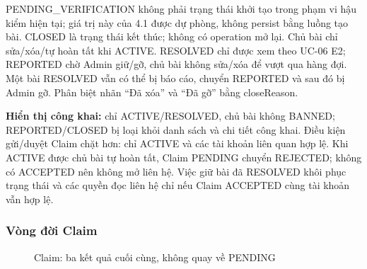 PENDING\_VERIFICATION không phải trạng thái khởi tạo trong phạm vi hậu kiểm hiện tại; giá trị này của 4.1 được dự phòng, không persist bằng luồng tạo bài. CLOSED là trạng thái kết thúc; không có operation mở lại. Chủ bài chỉ sửa/xóa/tự hoàn tất khi ACTIVE. RESOLVED chỉ được xem theo UC-06 E2; REPORTED chờ Admin giữ/gỡ, chủ bài không sửa/xóa để vượt qua hàng đợi. Một bài RESOLVED vẫn có thể bị báo cáo, chuyển REPORTED và sau đó bị Admin gỡ. Phân biệt nhãn ``Đã xóa'' và ``Đã gỡ'' bằng closeReason.

\textbf{Hiển thị công khai:} chỉ ACTIVE/RESOLVED, chủ bài không BANNED; REPORTED/CLOSED bị loại khỏi danh sách và chi tiết công khai. Điều kiện gửi/duyệt Claim chặt hơn: chỉ ACTIVE và các tài khoản liên quan hợp lệ. Khi ACTIVE được chủ bài tự hoàn tất, Claim PENDING chuyển REJECTED; không có ACCEPTED nên không mở liên hệ. Việc giữ bài đã RESOLVED khôi phục trạng thái và các quyền đọc liên hệ chỉ nếu Claim ACCEPTED cùng tài khoản vẫn hợp lệ.

\subsubsection{Vòng đời Claim}
\begin{figure}[H]
\centering
{}
\caption{\bodyfont Claim: ba kết quả cuối cùng, không quay về PENDING}
\label{fig:state-claim}
\end{figure}

